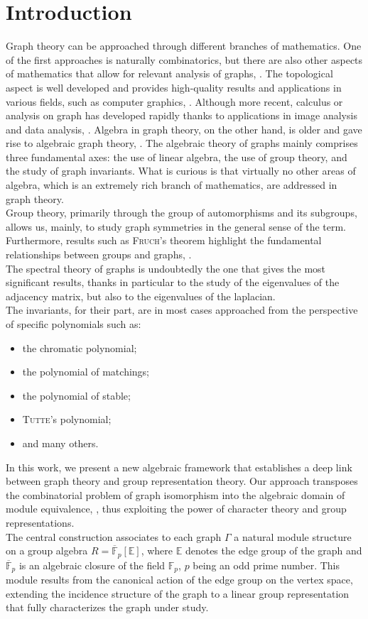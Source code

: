 \documentclass[preprint,12pt,authoryear]{elsarticle}
\theoremstyle{definition}
\begin{document}
\section{Introduction}


Graph theory can be approached through different branches of mathematics. One of the first approaches is naturally combinatorics, but there are also other aspects of mathematics that allow for relevant analysis of graphs, \cite{bre3}.  The topological aspect is well developed and provides high-quality results and applications in various fields, such as computer graphics, \cite{gross,archdeacon}. Although more recent, calculus or analysis on graph has developed rapidly thanks to applications in image analysis and data analysis, \cite{schott}. Algebra in graph theory, on the other hand, is older and gave rise to algebraic graph theory, \cite{brouwer,godsil,beineke}.
The algebraic theory of graphs mainly comprises three fundamental axes: the use of linear algebra, the use of group theory, and the study of graph invariants. What is curious is that virtually no other areas of algebra, which is an extremely rich branch of mathematics, are addressed in graph theory.\\
Group theory, primarily through the group of automorphisms and its subgroups, allows us, mainly, to study graph symmetries in the general sense of the term. Furthermore, results such as \textsc{Fruch}'s theorem highlight the fundamental relationships between groups and graphs, \cite{bre3}.\\
The spectral theory of graphs is undoubtedly the one that gives the most significant results, thanks in particular to the study of the eigenvalues of the adjacency matrix, but also to the eigenvalues of  the laplacian.\\
The invariants, for their part, are in most cases approached from the perspective of specific polynomials such as:
\begin{itemize}
\item[-] the chromatic polynomial;
\item[-] the polynomial of matchings;
\item[-] the polynomial of stable;
\item[-] \textsc{Tutte}'s polynomial;
\item[-] and many others.
\end{itemize}
In this work, we present a new algebraic framework that establishes a deep link between graph theory and group representation theory. Our approach transposes the combinatorial problem of graph isomorphism into the algebraic domain of module equivalence, \cite{ABF}, thus exploiting the power of character theory and group representations.\\
The central construction associates to each graph $\Gamma$ a natural module structure on a group algebra $R = \overline{\mathbb{F}}_p[\mathbb{E}]$, where $\mathbb{E}$ denotes the edge group of the graph and $\overline{\mathbb{F}}_p$ is an algebraic closure of the field $\mathbb{F}_p$, $p$ being an odd prime number. This module results from the canonical action of the edge group on the vertex space, extending the incidence structure of the graph to a linear group representation that fully characterizes the graph under study.
\end{document}
